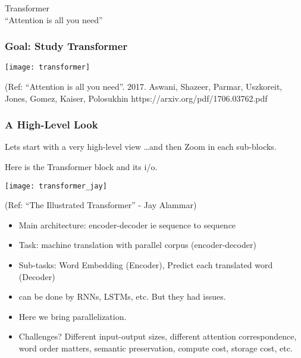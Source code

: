 \begin{frame}[fragile]\frametitle{}
\begin{center}
{\Large Transformer \\ \small ``Attention is all you need''}
\end{center}
\end{frame}



\begin{frame}[fragile]\frametitle{Goal: Study Transformer}


	\begin{center}
	\texttt{[image: transformer]}
	\end{center}		

{\tiny (Ref: ``Attention is all you need''. 2017.  Aswani, Shazeer, Parmar, Uszkoreit,  Jones, Gomez, Kaiser, Polosukhin  https://arxiv.org/pdf/1706.03762.pdf}


			
\end{frame}

\begin{frame}[fragile]\frametitle{A High-Level Look}

Lets start with a very high-level view \ldots and then Zoom in each sub-blocks.

Here is the Transformer block and its i/o.

\begin{center}
\texttt{[image: transformer\_jay]}

{\tiny (Ref: ``The Illustrated Transformer'' - Jay Alammar)}
\end{center}		

\begin{itemize}
\item Main architecture: encoder-decoder ie sequence to sequence
\item Task: machine translation with parallel corpus (encoder-decoder)
\item Sub-tasks: Word Embedding (Encoder), Predict each translated word (Decoder)
\item can be done by RNNs, LSTMs, etc. But they had issues.
\item Here we bring parallelization.
\item Challenges? Different input-output sizes, different attention correspondence, word order matters, semantic preservation, compute cost, storage cost, etc.
\end{itemize}

			
\end{frame}


